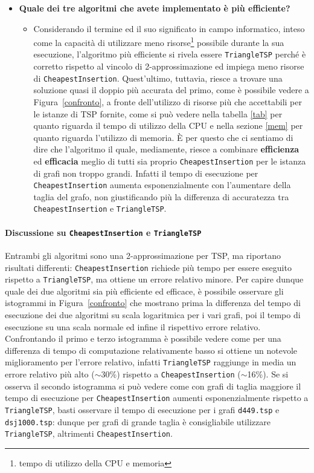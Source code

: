 \begin{itemize}
\begin{itemize}
	\end{itemize}
	\item \textbf{Quale dei tre algoritmi che avete implementato è più efficiente?}
	\begin{itemize}
		\item Considerando il termine  ed il suo significato in campo informatico, inteso come la capacità di utilizzare meno risorse\footnote{tempo di utilizzo della CPU e memoria} possibile durante la sua esecuzione, l'algoritmo più efficiente si rivela essere \texttt{TriangleTSP} perché è corretto rispetto al vincolo di 2-approssimazione ed impiega meno risorse di \texttt{CheapestInsertion}. Quest'ultimo, tuttavia, riesce a trovare una soluzione quasi il doppio più accurata del primo, come è possibile vedere a Figura~\ref{confronto}, a fronte dell'utilizzo di risorse più che accettabili per le istanze di TSP fornite, come si può vedere nella tabella \ref{tab} per quanto riguarda il tempo di utilizzo della CPU e nella sezione \ref{mem} per quanto riguarda l'utilizzo di memoria. \`{E} per questo che ci sentiamo di dire che l'algoritmo il quale, mediamente, riesce a combinare \textbf{efficienza} ed \textbf{efficacia} meglio di tutti sia proprio \texttt{CheapestInsertion} per le istanza di grafi non troppo grandi. Infatti il tempo di esecuzione per \texttt{CheapestInsertion} aumenta esponenzialmente con l'aumentare della taglia del grafo, non giustificando più la differenza di accuratezza tra \texttt{CheapestInsertion} e \texttt{TriangleTSP}.
	\end{itemize}
\end{itemize}


\paragraph{Discussione su \texttt{CheapestInsertion} e \texttt{TriangleTSP}} \label{ci-ttsp}
Entrambi gli algoritmi sono una 2-approssimazione per TSP, ma riportano risultati differenti: \texttt{CheapestInsertion} richiede più tempo per essere eseguito rispetto a \texttt{TriangleTSP}, ma ottiene un errore relativo minore.\eqcapo 
Per capire dunque quale dei due algoritmi sia più efficiente ed efficace, è possibile osservare gli istogrammi in Figura~\ref{confronto} che mostrano prima la differenza del tempo di esecuzione dei due algoritmi su scala logaritmica per i vari grafi, poi il tempo di esecuzione su una scala normale ed infine il rispettivo errore relativo. Confrontando il primo e terzo istogramma è possibile vedere come per una differenza di tempo di computazione relativamente basso si ottiene un notevole miglioramento per l'errore relativo, infatti \texttt{TriangleTSP} raggiunge in media un errore relativo più alto ($\sim$30\%) rispetto a \texttt{CheapestInsertion} ($\sim$16\%). Se si osserva il secondo istogramma si può vedere come con grafi di taglia maggiore il tempo di esecuzione per \texttt{CheapestInsertion} aumenti esponenzialmente rispetto a \texttt{TriangleTSP}, basti osservare il tempo di esecuzione per i grafi \texttt{d449.tsp} e \texttt{dsj1000.tsp}: dunque per grafi di grande taglia è consigliabile utilizzare \texttt{TriangleTSP}, altrimenti \texttt{CheapestInsertion}.

